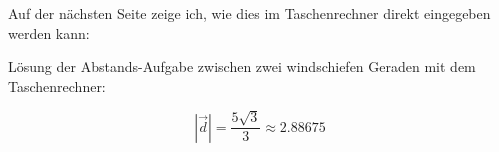 Auf der nächsten Seite zeige ich, wie dies im Taschenrechner direkt
eingegeben werden kann:
\newpage

Lösung der Abstands-Aufgabe zwischen zwei windschiefen Geraden mit dem
Taschenrechner:
\TRAINER{}


$$|\vec{d}| = \frac{5\sqrt{3}}{3} \approx 2.88675$$
\newpage

